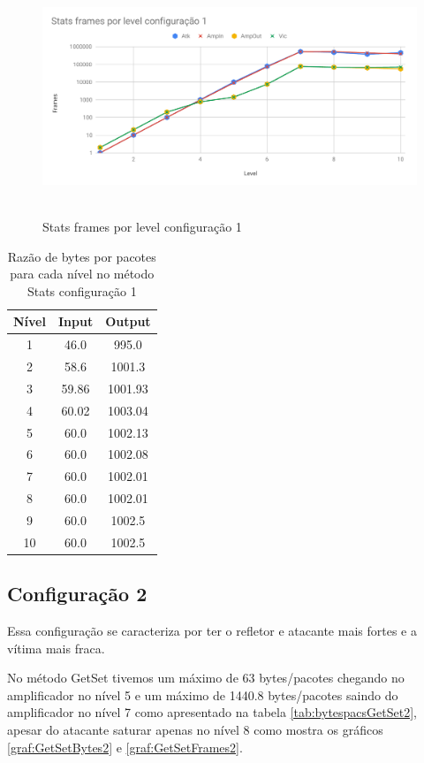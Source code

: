 \begin{figure}[H]
     \centering
     \label{graf:StatsFrames1}
     \includegraphics[scale=0.6]{img/capturas/StatsFLC1.pdf}\
     \caption{Stats frames por level configuração 1}
\end{figure}

\begin{table}[H]
\centering
\label{tab:bytespacsStats1}
\caption{Razão de bytes por pacotes para cada nível no método Stats configuração 1}
\begin{tabular}{|c|c|c|}
\hline
Nível & Input & Output  \\ \hline
1     & 46.0  & 995.0   \\ \hline
2     & 58.6  & 1001.3  \\ \hline
3     & 59.86 & 1001.93 \\ \hline
4     & 60.02 & 1003.04 \\ \hline
5     & 60.0  & 1002.13 \\ \hline
6     & 60.0  & 1002.08 \\ \hline
7     & 60.0  & 1002.01 \\ \hline
8     & 60.0  & 1002.01 \\ \hline
9     & 60.0  & 1002.5  \\ \hline
10    & 60.0  & 1002.5  \\ \hline
\end{tabular}
\end{table}

\subsection*{Configuração 2}

Essa configuração se caracteriza por ter o refletor e atacante mais fortes e a vítima mais
fraca.

No método GetSet tivemos um máximo de 63 bytes/pacotes chegando no amplificador no nível 5 e um máximo de 1440.8 bytes/pacotes saindo do amplificador no nível 7 como apresentado na tabela \ref{tab:bytespacsGetSet2}, apesar do atacante saturar apenas no nível 8 como mostra os gráficos \ref{graf:GetSetBytes2} e \ref{graf:GetSetFrames2}.


